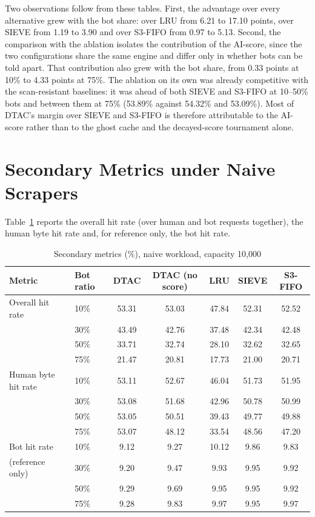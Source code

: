 Two observations follow from these tables. First, the advantage over every alternative grew with the bot share: over LRU from 6.21 to 17.10 points, over SIEVE from 1.19 to 3.90 and over S3-FIFO from 0.97 to 5.13. Second, the comparison with the ablation isolates the contribution of the AI-score, since the two configurations share the same engine and differ only in whether bots can be told apart. That contribution also grew with the bot share, from 0.33 points at 10\% to 4.33 points at 75\%. The ablation on its own was already competitive with the scan-resistant baselines: it was ahead of both SIEVE and S3-FIFO at 10--50\% bots and between them at 75\% (53.89\% against 54.32\% and 53.09\%). Most of DTAC's margin over SIEVE and S3-FIFO is therefore attributable to the AI-score rather than to the ghost cache and the decayed-score tournament alone.

\section{Secondary Metrics under Naive Scrapers}
Table~\ref{tab:secondary-naive} reports the overall hit rate (over human and bot requests together), the human byte hit rate and, for reference only, the bot hit rate.

\begin{table}[htbp]
    \centering
    \caption{Secondary metrics (\%), naive workload, capacity 10{,}000}
    \label{tab:secondary-naive}
    \small
    \begin{tabular}{llccccc}
        \toprule
        Metric & Bot ratio & DTAC & DTAC (no score) & LRU & SIEVE & S3-FIFO \\
        \midrule
        Overall hit rate & 10\% & 53.31 & 53.03 & 47.84 & 52.31 & 52.52 \\
         & 30\% & 43.49 & 42.76 & 37.48 & 42.34 & 42.48 \\
         & 50\% & 33.71 & 32.74 & 28.10 & 32.62 & 32.65 \\
         & 75\% & 21.47 & 20.81 & 17.73 & 21.00 & 20.71 \\
        \midrule
        Human byte hit rate & 10\% & 53.11 & 52.67 & 46.04 & 51.73 & 51.95 \\
         & 30\% & 53.08 & 51.68 & 42.96 & 50.78 & 50.99 \\
         & 50\% & 53.05 & 50.51 & 39.43 & 49.77 & 49.88 \\
         & 75\% & 53.07 & 48.12 & 33.54 & 48.56 & 47.20 \\
        \midrule
        Bot hit rate & 10\% & 9.12 & 9.27 & 10.12 & 9.86 & 9.83 \\
        (reference only) & 30\% & 9.20 & 9.47 & 9.93 & 9.95 & 9.92 \\
         & 50\% & 9.29 & 9.69 & 9.95 & 9.95 & 9.92 \\
         & 75\% & 9.28 & 9.83 & 9.97 & 9.95 & 9.97 \\
        \bottomrule
    \end{tabular}
\end{table}

